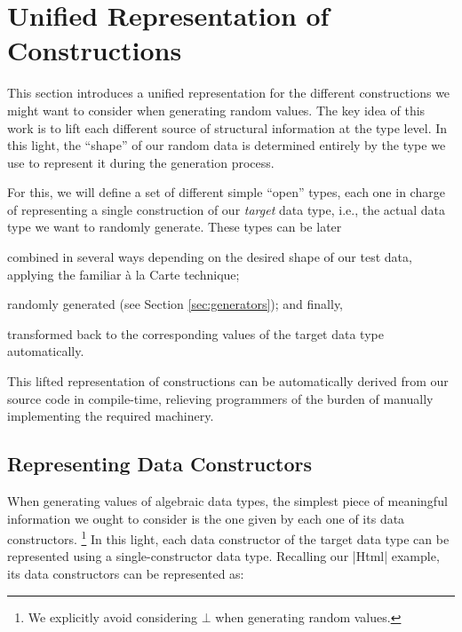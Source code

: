 \section{Unified Representation of Constructions}
\label{sec:representation}

%
This section introduces a unified representation for the different constructions
we might want to consider when generating random values.
%
The key idea of this work is to lift each different source of structural
information at the type level.
%
In this light, the ``shape'' of our random data is determined entirely by the
type we use to represent it during the generation process.


For this, we will define a set of different simple ``open'' types, each one in
charge of representing a single construction of our \emph{target} data type,
i.e., the actual data type we want to randomly generate.
%
These types can be later
%
\begin{inparaenum}[(i)]
\item combined in several ways depending on the desired shape of our test data,
  applying the familiar \`a la Carte technique;
\item randomly generated (see Section \ref{sec:generators}); and finally,
\item transformed back to the corresponding values of the target data type
  automatically.
\end{inparaenum}
%
This lifted representation of constructions can be automatically derived from
our source code in compile-time, relieving programmers of the burden of manually
implementing the required machinery.


%
\subsection{Representing Data Constructors}

When generating values of algebraic data types, the simplest piece of meaningful
information we ought to consider is the one given by each one of its data
constructors.
%
\footnote{We explicitly avoid considering $\bot$ when generating random values.}
%
In this light, each data constructor of the target data type can be represented
using a single-constructor data type.
%
Recalling our |Html| example, its data constructors can be represented as:
%

